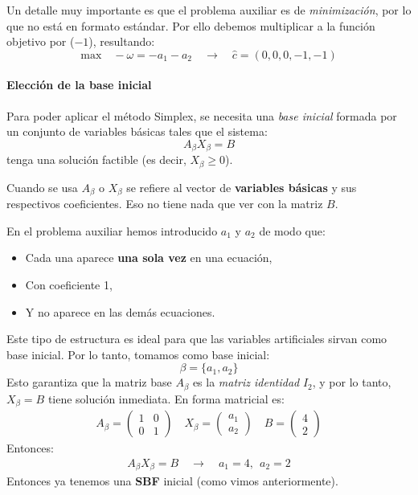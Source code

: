 Un detalle muy importante es que el problema auxiliar es de \textit{minimización}, por lo que no está en formato estándar. Por ello debemos multiplicar a la función objetivo por (\(-1\)), resultando:
\[
  \text{max} \quad -\omega = - a_1 - a_2 \quad \rightarrow \quad \hat{c}=(0,0,0,-1,-1)
\]

\paragraph{Elección de la base inicial}

Para poder aplicar el método Simplex, se necesita una \textit{base inicial} formada por un conjunto de variables básicas tales que el sistema:
\[
A_{\beta}X_{\beta} = B
\]
tenga una solución factible (es decir, \(X_\beta \geq 0\)).
\begin{tcolorbox}[remember, title=Aclaración]
  Cuando se usa \(A_\beta\) o \(X_\beta\) se refiere al vector de \textbf{variables básicas} y sus respectivos coeficientes. Eso no tiene nada que ver con la matriz \(B\).
\end{tcolorbox}

En el problema auxiliar hemos introducido \(a_1\) y \(a_2\) de modo que:
\begin{itemize}
  \item Cada una aparece \textbf{una sola vez} en una ecuación,
  \item Con coeficiente 1,
  \item Y no aparece en las demás ecuaciones.
\end{itemize}
Este tipo de estructura es ideal para que las variables artificiales sirvan como base inicial. Por lo tanto, tomamos como base inicial:
\[
  \beta = \{a_1, a_2\}
\]
Esto garantiza que la matriz base \(A_\beta\) es la \textit{matriz identidad} \(I_2\), y por lo tanto, \(X_\beta = B\) tiene solución inmediata. En forma matricial es:
\begin{align*}
  A_\beta =
  \begin{pmatrix}
    1 & 0\\
    0 & 1
  \end{pmatrix}
  \quad
  X_\beta =
  \begin{pmatrix}
    a_1\\
    a_2
  \end{pmatrix}
  \quad
  B =
  \begin{pmatrix}
    4\\
    2
  \end{pmatrix}
\end{align*}
Entonces:
\begin{align*}
  A_\beta X_\beta = B \quad \rightarrow \quad {a_1} = 4, ~~ {a_2} = 2
\end{align*}
Entonces ya tenemos una \textbf{SBF} inicial (como vimos anteriormente).

